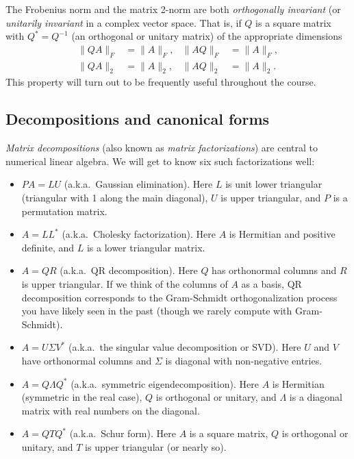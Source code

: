 \documentclass[12pt, leqno]{article}
\begin{document}
The Frobenius norm and the matrix 2-norm are both {\em orthogonally
  invariant} (or {\em unitarily invariant} in a complex vector space.
That is, if $Q$ is a square matrix with $Q^* = Q^{-1}$ (an orthogonal
or unitary matrix) of the appropriate dimensions
\begin{align*}
  \|QA\|_F &= \|A\|_F, &
  \|AQ\|_F &= \|A\|_F, \\
  \|QA\|_2 &= \|A\|_2, &
  \|AQ\|_2 &= \|A\|_2.
\end{align*}
This property will turn out to be frequently useful throughout the course.

\subsection{Decompositions and canonical forms}

{\em Matrix decompositions} (also known as
{\em matrix factorizations}) are central to numerical linear algebra.
We will get to know six such factorizations well:
\begin{itemize}
\item
  $PA = LU$ (a.k.a.~Gaussian elimination).  Here $L$ is unit lower
  triangular (triangular with 1 along the main diagonal), $U$ is upper
  triangular, and $P$ is a permutation matrix.
\item
  $A = LL^*$ (a.k.a.~Cholesky factorization).  Here $A$ is Hermitian
  and positive definite, and $L$ is a lower triangular matrix.
\item
  $A = QR$ (a.k.a.~QR decomposition).  Here $Q$ has orthonormal
  columns and $R$ is upper triangular.  If we think of the columns
  of $A$ as a basis, QR decomposition corresponds to the Gram-Schmidt
  orthogonalization process you have likely seen in the past (though
  we rarely compute with Gram-Schmidt).
\item
  $A = U \Sigma V^*$ (a.k.a.~the singular value decomposition or SVD).
  Here $U$ and $V$ have orthonormal columns and $\Sigma$ is diagonal
  with non-negative entries.
\item
  $A = Q \Lambda Q^*$ (a.k.a.~symmetric eigendecomposition).  Here $A$
  is Hermitian (symmetric in the real case), $Q$ is orthogonal or
  unitary, and $\Lambda$ is a diagonal matrix with real numbers on the
  diagonal.
\item
  $A = QTQ^*$ (a.k.a.~Schur form).  Here $A$ is a square matrix, $Q$
  is orthogonal or unitary, and $T$ is upper triangular (or nearly
  so).
\end{itemize}
\end{document}
